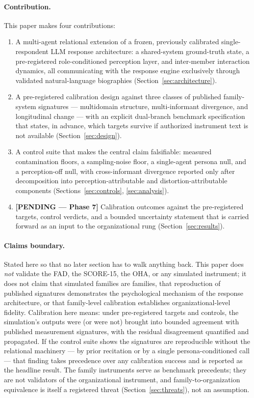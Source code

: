\documentclass[12pt, letterpaper]{article}
\newcommand{\pending}[1]{\textcolor{blue!55!black}{\textbf{[PENDING --- #1]}}}
\begin{document}
\paragraph{Contribution.} This paper makes four contributions:
\begin{enumerate}[nosep]
    \item A multi-agent relational extension of a frozen, previously calibrated single-respondent LLM response architecture: a shared-system ground-truth state, a pre-registered role-conditioned perception layer, and inter-member interaction dynamics, all communicating with the response engine exclusively through validated natural-language biographies (Section~\ref{sec:architecture}).
    \item A pre-registered calibration design against three classes of published family-system signatures --- multidomain structure, multi-informant divergence, and longitudinal change --- with an explicit dual-branch benchmark specification that states, in advance, which targets survive if authorized instrument text is not available (Section~\ref{sec:design}).
    \item A control suite that makes the central claim falsifiable: measured contamination floors, a sampling-noise floor, a single-agent persona null, and a perception-off null, with cross-informant divergence reported only after decomposition into perception-attributable and distortion-attributable components (Sections~\ref{sec:controls}, \ref{sec:analysis}).
    \item \pending{Phase 7} Calibration outcomes against the pre-registered targets, control verdicts, and a bounded uncertainty statement that is carried forward as an input to the organizational rung (Section~\ref{sec:results}).
\end{enumerate}

\paragraph{Claims boundary.} Stated here so that no later section has to walk anything back. This paper does \emph{not} validate the FAD, the SCORE-15, the OHA, or any simulated instrument; it does not claim that simulated families are families, that reproduction of published signatures demonstrates the psychological mechanism of the response architecture, or that family-level calibration establishes organizational-level fidelity. Calibration here means: under pre-registered targets and controls, the simulation's outputs were (or were not) brought into bounded agreement with published measurement signatures, with the residual disagreement quantified and propagated. If the control suite shows the signatures are reproducible without the relational machinery --- by prior recitation or by a single persona-conditioned call --- that finding takes precedence over any calibration success and is reported as the headline result. The family instruments serve as benchmark precedents; they are not validators of the organizational instrument, and family-to-organization equivalence is itself a registered threat (Section~\ref{sec:threats}), not an assumption.
\end{document}
